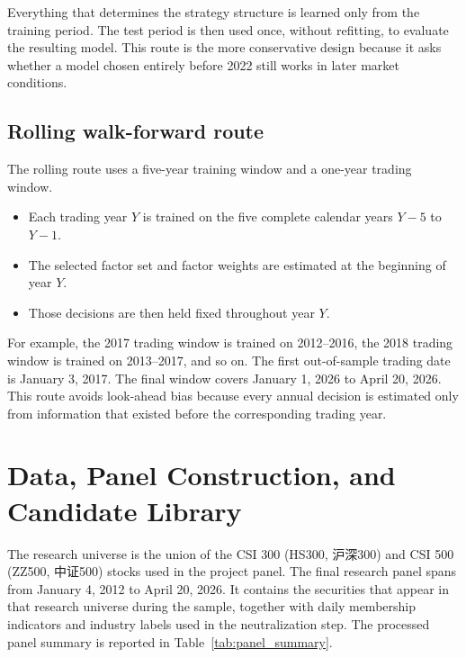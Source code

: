 \documentclass[11pt]{article}
\begin{document}
Everything that determines the strategy structure is learned only from the training period. The test period is then used once, without refitting, to evaluate the resulting model. This route is the more conservative design because it asks whether a model chosen entirely before 2022 still works in later market conditions.

\subsection{Rolling walk-forward route}

The rolling route uses a five-year training window and a one-year trading window.

\begin{itemize}
    \item Each trading year \(Y\) is trained on the five complete calendar years \(Y-5\) to \(Y-1\).
    \item The selected factor set and factor weights are estimated at the beginning of year \(Y\).
    \item Those decisions are then held fixed throughout year \(Y\).
\end{itemize}

For example, the 2017 trading window is trained on 2012--2016, the 2018 trading window is trained on 2013--2017, and so on. The first out-of-sample trading date is January 3, 2017. The final window covers January 1, 2026 to April 20, 2026. This route avoids look-ahead bias because every annual decision is estimated only from information that existed before the corresponding trading year.

\section{Data, Panel Construction, and Candidate Library}

The research universe is the union of the CSI 300 (HS300, 沪深300) and CSI 500 (ZZ500, 中证500) stocks used in the project panel. The final research panel spans from January 4, 2012 to April 20, 2026. It contains the securities that appear in that research universe during the sample, together with daily membership indicators and industry labels used in the neutralization step. The processed panel summary is reported in Table~\ref{tab:panel_summary}.

\begin{table}[H]
\centering
\caption{Processed research panel summary}
\label{tab:panel_summary}

\end{table}
\end{document}
